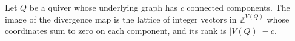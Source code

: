 \begin{proposition}\label{Arden24-prop-2.1}
\label{Arden24-prop:image}
Let $Q$ be a quiver whose underlying graph has $c$ connected components. The image of the divergence map is the lattice of integer vectors in $\mathbb{Z}^{V(Q)}$ whose coordinates sum to zero on each component, and its rank is $|V(Q)| - c$.
\end{proposition}